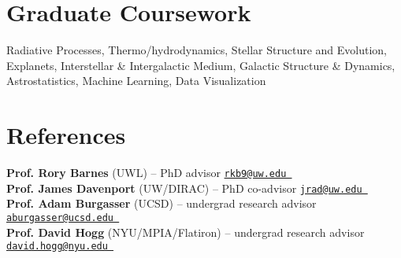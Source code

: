 \documentclass[a4,11pt]{article}
\let\orighref\href
\renewcommand{\href}[2]{\orighref{#1}{#2\,\scriptsize\faExternalLink}}
\begin{document}

\section{Graduate Coursework}

Radiative Processes, Thermo/hydrodynamics, Stellar Structure and Evolution, Explanets, Interstellar \& Intergalactic Medium, Galactic Structure \& Dynamics, Astrostatistics, Machine Learning, Data Visualization

\section{References}

\textbf{Prof. Rory Barnes} (UWL) -- PhD advisor \hfill {\tt \href{rkb9@uw.edu}{rkb9@uw.edu}} \\
\textbf{Prof. James Davenport} (UW/DIRAC) -- PhD co-advisor \hfill {\tt \href{jrad@uw.edu}{jrad@uw.edu}} \\
\textbf{Prof. Adam Burgasser} (UCSD) -- undergrad research advisor \hfill {\tt \href{aburgasser@ucsd.edu}{aburgasser@ucsd.edu}}   \\
\textbf{Prof. David Hogg} (NYU/MPIA/Flatiron) -- undergrad research advisor \hfill {\tt \href{david.hogg@nyu.edu}{david.hogg@nyu.edu}}  \\


\end{document}
